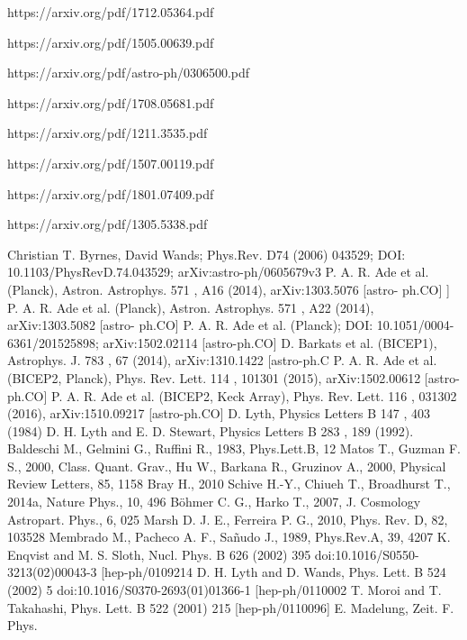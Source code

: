 \documentclass[amssymb,twocolumn,prd,nofootinbib,showpacs]{revtex4-1}
\begin{document}
https://arxiv.org/pdf/1712.05364.pdf

https://arxiv.org/pdf/1505.00639.pdf

https://arxiv.org/pdf/astro-ph/0306500.pdf

https://arxiv.org/pdf/1708.05681.pdf

https://arxiv.org/pdf/1211.3535.pdf

https://arxiv.org/pdf/1507.00119.pdf

https://arxiv.org/pdf/1801.07409.pdf

https://arxiv.org/pdf/1305.5338.pdf

\begin{thebibliography}{9}
 Christian T. Byrnes, David Wands;  Phys.Rev. D74 (2006) 043529; DOI:  	10.1103/PhysRevD.74.043529;  arXiv:astro-ph/0605679v3
  P. A. R. Ade
et al.
(Planck), Astron. Astrophys.
571
, A16 (2014), arXiv:1303.5076 [astro-
ph.CO]
 ]  P. A. R. Ade
et al.
(Planck), Astron. Astrophys.
571
, A22 (2014), arXiv:1303.5082 [astro-
ph.CO]
 P. A. R. Ade et al. (Planck); DOI: 	10.1051/0004-6361/201525898;  	arXiv:1502.02114 [astro-ph.CO]
  D. Barkats
et al.
(BICEP1), Astrophys. J.
783
, 67 (2014), arXiv:1310.1422 [astro-ph.C
 P. A. R. Ade
et al.
(BICEP2, Planck), Phys. Rev. Lett.
114
, 101301 (2015), arXiv:1502.00612
[astro-ph.CO]
  P.  A.  R.  Ade
et al.
(BICEP2,   Keck  Array),  Phys.  Rev.  Lett.
116
,  031302  (2016),
arXiv:1510.09217 [astro-ph.CO]
  D. Lyth, Physics Letters B
147
, 403  (1984)
  D. H. Lyth and E. D. Stewart, Physics Letters B
283
, 189  (1992).
 Baldeschi M., Gelmini G., Ruffini R., 1983, Phys.Lett.B, 12
 Matos T., Guzman F. S., 2000, Class. Quant. Grav., 
 Hu W., Barkana R., Gruzinov A., 2000, Physical Review Letters, 85, 1158
Bray H., 2010
Schive H.-Y., Chiueh T., Broadhurst T., 2014a, Nature Phys., 10, 496
Böhmer C. G., Harko T., 2007, J. Cosmology Astropart. Phys., 6, 025
Marsh D. J. E., Ferreira P. G., 2010, Phys. Rev. D, 82, 103528
 Membrado M., Pacheco A. F., Sañudo J., 1989, Phys.Rev.A, 39, 4207
K. Enqvist and M. S. Sloth, Nucl. Phys. B
626
(2002) 395 doi:10.1016/S0550-3213(02)00043-3
[hep-ph/0109214
D. H. Lyth and D. Wands, Phys. Lett. B
524
(2002) 5 doi:10.1016/S0370-2693(01)01366-1
[hep-ph/0110002
 T. Moroi and T. Takahashi, Phys. Lett. B
522
(2001) 215 [hep-ph/0110096]
  E. Madelung, Zeit. F. Phys.

\end{thebibliography}
\end{document}
